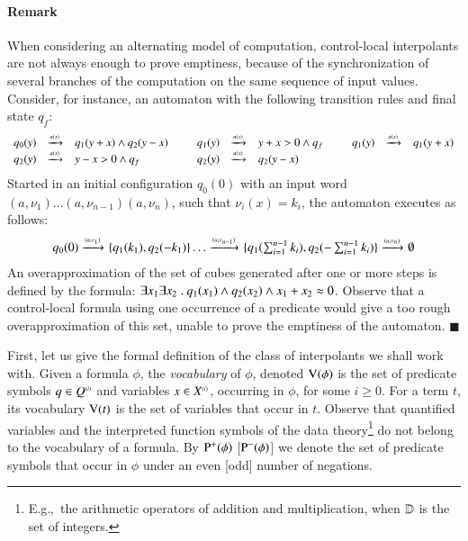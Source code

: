 \paragraph{Remark}
When considering an alternating model of computation, control-local
interpolants are not always enough to prove emptiness, because of the
synchronization of several branches of the computation on the same
sequence of input values. Consider, for instance, an automaton with
the following transition rules and final state $q_f$:
\[\begin{array}{rclcrclcrcl}
q_0(y) & \xrightarrow{{\scriptscriptstyle a(x)}}_{{\scriptstyle }} & q_1(y+x) \wedge q_2(y-x) & \hspace*{2mm} & 
q_1(y) & \xrightarrow{{\scriptscriptstyle a(x)}}_{{\scriptstyle }} & y+x > 0 \wedge q_f & \hspace*{2mm} & 
q_1(y) & \xrightarrow{{\scriptscriptstyle a(x)}}_{{\scriptstyle }} & q_1(y+x) \\ 
q_2(y) & \xrightarrow{{\scriptscriptstyle a(x)}}_{{\scriptstyle }} & y-x > 0 \wedge q_f && 
q_2(y) & \xrightarrow{{\scriptscriptstyle a(x)}}_{{\scriptstyle }} & q_2(y-x)
\end{array}\]
Started in an initial configuration $q_0(0)$ with an input word
$(a,\nu_1) \ldots (a,\nu_{n-1}) (a,\nu_n)$, such that $\nu_i(x)=k_i$,
the automaton executes as follows:
\[\begin{array}{c}
q_0(0) \xrightarrow{{\scriptscriptstyle (a,\nu_1)}}_{{\scriptstyle }} \{ q_1(k_1),q_2(-k_1) \} \ldots \xrightarrow{{\scriptscriptstyle (a,\nu_{n-1})}}_{{\scriptstyle }} 
\{ q_1(\sum_{i=1}^{n-1} k_i),q_2(-\sum_{i=1}^{n-1} k_i) \}
\xrightarrow{{\scriptscriptstyle (a,\nu_n)}}_{{\scriptstyle }} \emptyset
\end{array}\]
An overapproximation of the set of cubes generated after one or more
steps is defined by the formula: $\exists x_1 \exists x_2 ~.~ q_1(x_1)
\wedge q_2(x_2) \wedge x_1+x_2 \approx 0$. Observe that a control-local
formula using one occurrence of a predicate would give a too rough
overapproximation of this set, unable to prove the emptiness of the
automaton. \hfill$\blacksquare$

First, let us give the formal definition of the class of interpolants
we shall work with. Given a formula $\phi$, the \emph{vocabulary} of
$\phi$, denoted $\mathrm{V}({\phi})$ is the set of predicate symbols $q \in
{Q}^{\scriptscriptstyle{({i})}}$ and variables $x \in {X}^{\scriptscriptstyle{({i})}}$, occurring in $\phi$,
for some $i\geq0$. For a term $t$, its vocabulary $\mathrm{V}({t})$ is the set
of variables that occur in $t$. Observe that quantified variables and
the interpreted function symbols of the data
theory\footnote{E.g.,\ the arithmetic operators of addition and
  multiplication, when $\mathbb{D}$ is the set of integers.}  do not belong
to the vocabulary of a formula. By $\mathrm{P}^{+}(\phi)$ [$\mathrm{P}^{-}(\phi)$]
we denote the set of predicate symbols that occur in $\phi$ under an
even [odd] number of negations.

